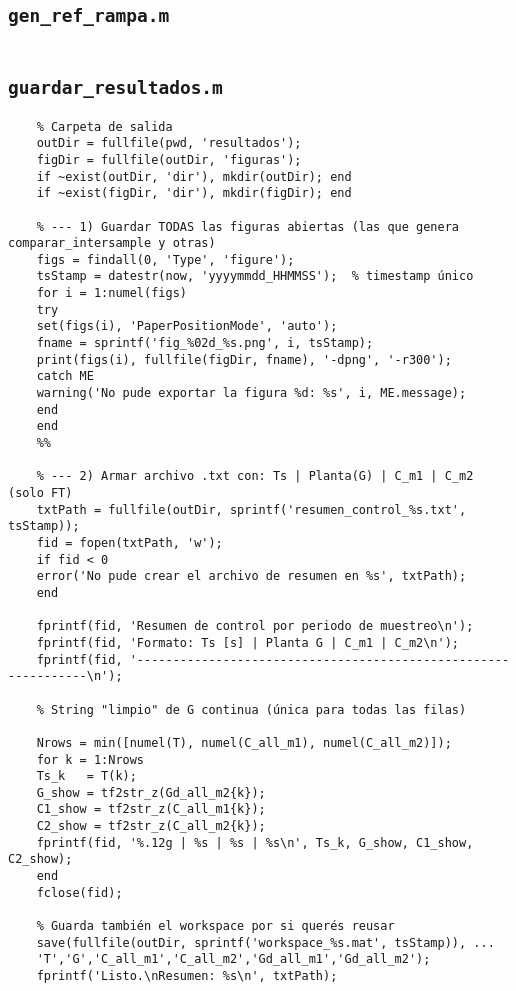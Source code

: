 \subsection{\texttt{gen\_ref\_rampa.m}}
\begin{lstlisting}[style=matlabstyle,caption={Generador de referencia tipo rampa.}]
	% === Pegar aquí el contenido de gen_ref_rampa.m ===
\end{lstlisting}

\subsection{\texttt{guardar\_resultados.m}}
\begin{lstlisting}[style=matlabstyle,caption={Guardado de resultados y figuras.}]
	%% ================== Guardar figuras e informe ==================
	% Carpeta de salida
	outDir = fullfile(pwd, 'resultados');
	figDir = fullfile(outDir, 'figuras');
	if ~exist(outDir, 'dir'), mkdir(outDir); end
	if ~exist(figDir, 'dir'), mkdir(figDir); end
	
	% --- 1) Guardar TODAS las figuras abiertas (las que genera comparar_intersample y otras)
	figs = findall(0, 'Type', 'figure');
	tsStamp = datestr(now, 'yyyymmdd_HHMMSS');  % timestamp único
	for i = 1:numel(figs)
	try
	set(figs(i), 'PaperPositionMode', 'auto');
	fname = sprintf('fig_%02d_%s.png', i, tsStamp);
	print(figs(i), fullfile(figDir, fname), '-dpng', '-r300');
	catch ME
	warning('No pude exportar la figura %d: %s', i, ME.message);
	end
	end
	%%
	
	% --- 2) Armar archivo .txt con: Ts | Planta(G) | C_m1 | C_m2 (solo FT)
	txtPath = fullfile(outDir, sprintf('resumen_control_%s.txt', tsStamp));
	fid = fopen(txtPath, 'w');
	if fid < 0
	error('No pude crear el archivo de resumen en %s', txtPath);
	end
	
	fprintf(fid, 'Resumen de control por periodo de muestreo\n');
	fprintf(fid, 'Formato: Ts [s] | Planta G | C_m1 | C_m2\n');
	fprintf(fid, '---------------------------------------------------------------\n');
	
	% String "limpio" de G continua (única para todas las filas)
	
	Nrows = min([numel(T), numel(C_all_m1), numel(C_all_m2)]);
	for k = 1:Nrows
	Ts_k   = T(k);
	G_show = tf2str_z(Gd_all_m2{k});
	C1_show = tf2str_z(C_all_m1{k});
	C2_show = tf2str_z(C_all_m2{k});
	fprintf(fid, '%.12g | %s | %s | %s\n', Ts_k, G_show, C1_show, C2_show);
	end
	fclose(fid);
	
	% Guarda también el workspace por si querés reusar
	save(fullfile(outDir, sprintf('workspace_%s.mat', tsStamp)), ...
	'T','G','C_all_m1','C_all_m2','Gd_all_m1','Gd_all_m2');
	fprintf('Listo.\nResumen: %s\n', txtPath);
	

\end{lstlisting}
